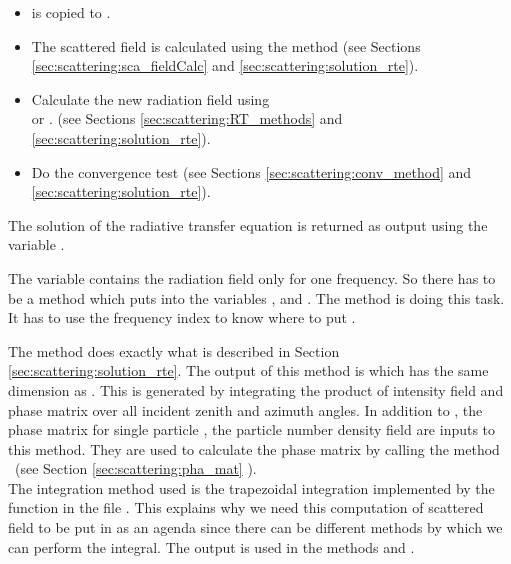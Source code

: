 \begin{itemize}
\item {} is copied to .
\item The scattered field is calculated using the method
    (see Sections \ref{sec:scattering:sca_fieldCalc} and
    \ref{sec:scattering:solution_rte}).
\item Calculate the new radiation field using\\
   or .
 (see Sections \ref{sec:scattering:RT_methods} and
  \ref{sec:scattering:solution_rte}).
\item Do the convergence test (see Sections
  \ref{sec:scattering:conv_method} and \ref{sec:scattering:solution_rte}).
\end{itemize}
The solution of the radiative transfer equation is returned as output
using the variable . 

The variable  contains the radiation field only
for one frequency. So there has to be a method which puts
 into the variables ,
 and . The method
 is doing this task.
It has to use the frequency index to know where
to put .
 

\label{sec:scattering:sca_fieldCalc}
The method  does exactly what is
described in Section 
\ref{sec:scattering:solution_rte}.  The output of this method is
 which has the same dimension as
.  This is generated by integrating the product of
intensity field  and phase matrix
 over all incident zenith and azimuth angles.  In
addition to , the phase matrix for single 
particle , the particle number density field
 are inputs to this method.  They are used
to calculate the phase matrix  by calling the
method \ (see Section
\ref{sec:scattering:pha_mat} ). \\ 
The integration method used is the trapezoidal integration implemented
by the function  in the file
.  This explains why we need this
computation of scattered field to be
put in as an agenda since there can be different methods by which we
can perform the integral. 
The output  is used in the
methods  and .

